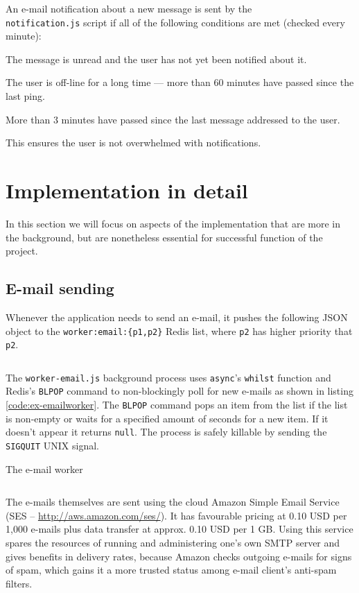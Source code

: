 \documentclass[12pt,oneside]{fithesis}
\begin{document}
	  An e-mail notification about a new message is sent by the\\\texttt{notification.js} script if all of the following conditions are met (checked every minute):
	  \begin{compactitem}
	  	\item The message is unread and the user has not yet been notified about it.
	    \item The user is off-line for a long time --- more than 60 minutes have passed since the last ping.
	    \item More than 3 minutes have passed since the last message addressed to the user.
	  \end{compactitem}
	  This ensures the user is not overwhelmed with notifications.
\section{Implementation in detail}
	In this section we will focus on aspects of the implementation that are more in the background, but are nonetheless essential for successful function of the project.
	\subsection{E-mail sending}
		\label{section:email}
		Whenever the application needs to send an e-mail, it pushes the following JSON object to the \texttt{worker:email:\{p1,p2\}} Redis list, where \texttt{p2} has higher priority that \texttt{p2}.
		\inputminted[fontsize=\footnotesize, linenos=false]{javascript}{ex-emailobj.js}
		
		The \texttt{worker-email.js} background process uses \texttt{async}'s \texttt{whilst} function and Redis's \texttt{BLPOP} command to non-blockingly poll for new e-mails as shown in listing \ref{code:ex-emailworker}. The \texttt{BLPOP} command pops an item from the list if the list is non-empty or waits for a specified amount of seconds for a new item. If it doesn't appear it returns \texttt{null}. The process is safely killable by sending the \texttt{SIGQUIT} UNIX signal.
		
		\begin{program}[h]
		\caption{The e-mail worker}
		\label{code:ex-emailworker}
		\inputminted[fontsize=\footnotesize, linenos=false]{javascript}{ex-emailworker.js}
		\end{program}
		
		The e-mails themselves are sent using the cloud Amazon Simple Email Service (SES -- \url{http://aws.amazon.com/ses/}). It has favourable pricing at 0.10 USD per 1,000 e-mails plus data transfer at approx. 0.10 USD per 1 GB. Using this service spares the resources of running and administering one's own SMTP server and gives benefits in delivery rates, because Amazon checks outgoing e-mails for signs of spam, which gains it a more trusted status among e-mail client's anti-spam  filters.
\end{document}
